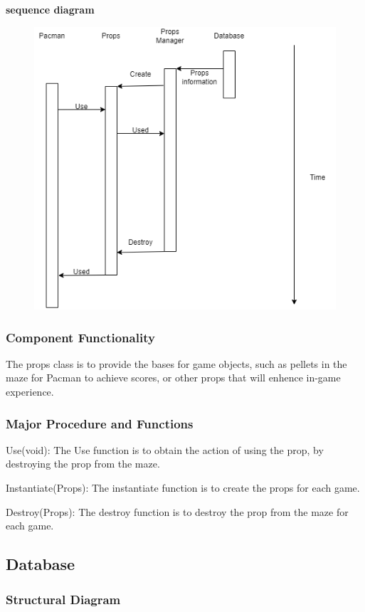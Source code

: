 \documentclass[11pt]{article}
\begin{document}
\textbf{sequence diagram}\\
\begin{figure}[H]
    \centering
    \includegraphics*[scale=0.4]{Props_sequence.png}
\end{figure}
\subsubsection{Component Functionality}
The props class is to provide the bases for game objects, such as pellets in the maze for Pacman to achieve scores, or other props that will enhence in-game experience.
\subsubsection{Major Procedure and Functions}
Use(void): The Use function is to obtain the action of using the prop, by destroying the prop from the maze.

Instantiate(Props): The instantiate function is to create the props for each game.

Destroy(Props): The destroy function is to destroy the prop from the maze for each game.

\subsection{Database}
\subsubsection{Structural Diagram}
\end{document}
